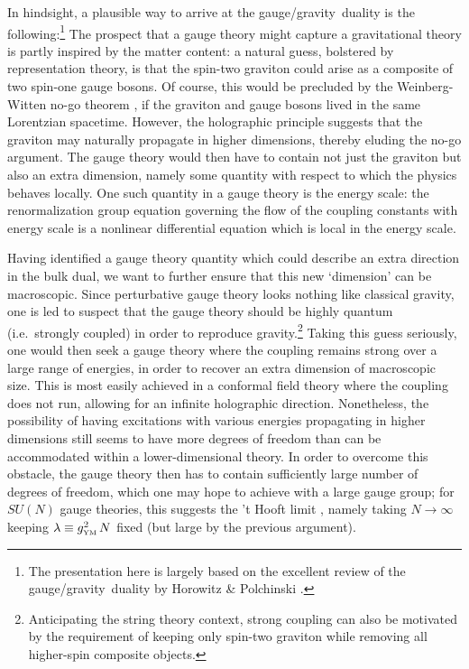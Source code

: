 \documentclass[12pt]{article}
\def\GG{gauge/gravity}
\def\gYM{g_{\scriptscriptstyle {\rm YM}}}
\begin{document}
In hindsight, a plausible way to arrive at the \GG\ duality is the following:\footnote{
The presentation here is  largely based on the excellent review of the \GG\ duality by Horowitz \& Polchinski \cite{Horowitz:2006ct}.}
The prospect that a gauge theory might capture a gravitational theory is partly inspired by the matter content: a natural guess, bolstered by representation theory, is that the spin-two graviton could arise as a composite of two spin-one gauge bosons.  Of course, this would be precluded by the Weinberg-Witten no-go theorem \cite{Weinberg:1980kq}, if the graviton and gauge bosons lived in the same Lorentzian spacetime.  However, the holographic principle suggests that the graviton may naturally propagate in higher dimensions, thereby eluding the no-go argument.  The gauge theory would then have to contain not just the graviton but also an extra dimension, namely some quantity with respect to which the physics behaves locally.  One such quantity in a gauge theory is the energy scale:  the renormalization group equation governing the flow of the coupling constants with energy scale is a nonlinear differential equation which is local in the energy scale.  

Having identified a gauge theory quantity which could describe an extra direction in the bulk dual, we want to further ensure that this new `dimension' can be macroscopic.  Since perturbative gauge theory looks nothing like classical gravity, one is led to suspect that the gauge theory should be highly quantum (i.e.\ strongly coupled) in order to reproduce gravity.\footnote{
Anticipating the string theory context, strong coupling can also be motivated by the requirement of keeping only spin-two graviton while removing all higher-spin composite objects.
}
Taking this guess seriously, one would then seek a gauge theory where the coupling remains strong over a large range of energies, in order to recover an extra dimension of macroscopic size.  This is most easily achieved in a conformal field theory where the coupling does not run, allowing for an infinite holographic direction.  
Nonetheless, the possibility of having excitations with various energies propagating in higher dimensions still seems to have more degrees of freedom than can be accommodated within a lower-dimensional theory.  In order to overcome this obstacle, the gauge theory then has to contain sufficiently large number of degrees of freedom, which one may hope to  achieve with a large gauge group;  for $SU(N)$ gauge theories, this suggests the  't Hooft limit \cite{tHooft:1973jz}, namely taking $N \to \infty$ keeping $\lambda \equiv \gYM^2 \, N$ fixed (but large by the previous argument).
\end{document}
